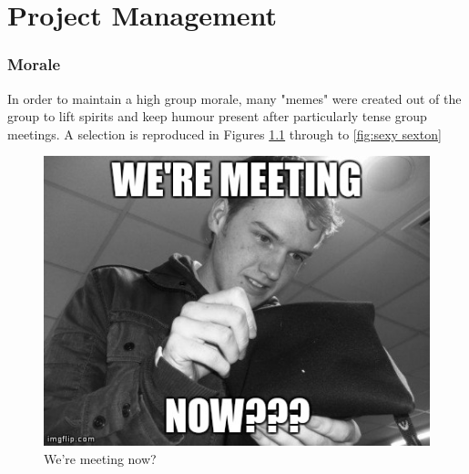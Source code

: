 \chapter{Project Management}
\label{project management}

\subsection{Morale}
\label{morale}
In order to maintain a high group morale, many "memes" were created out of the group to lift spirits and keep humour present after particularly tense group meetings. A selection is reproduced in Figures \ref{fig:we're meeting now?} through to \ref{fig:sexy sexton}

\begin{figure}[h]
\begin{center}
\includegraphics[scale=0.4]{./design/nathan} 
\end{center}
\caption{We're meeting now?}
\label{fig:we're meeting now?}
\end{figure} 

